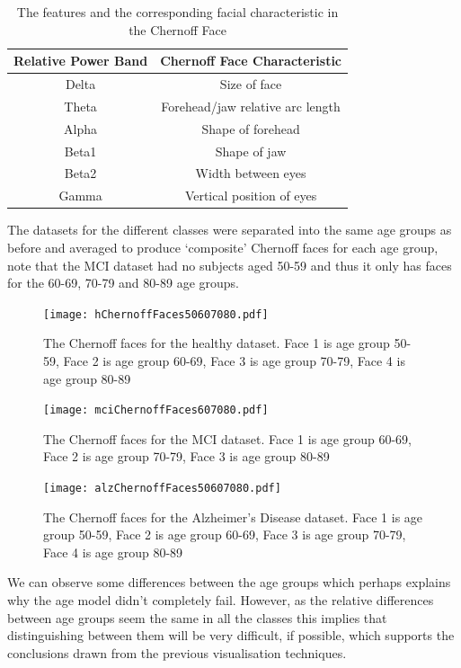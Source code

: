 \begin{table}[h!]
\begin{center}
\begin{tabular}[h!]{|c|c|}
\hline
Relative Power Band & Chernoff Face Characteristic \\
\hline
Delta & Size of face \\
\hline
Theta & Forehead/jaw relative arc length \\
\hline
Alpha & Shape of forehead\\
\hline
Beta1 & Shape of jaw\\
\hline
Beta2 & Width between eyes\\
\hline
Gamma & Vertical position of eyes\\
\hline
\end{tabular}
\caption{The features and the corresponding facial characteristic in the Chernoff Face}
\label{tab:chernoff}
\end{center}
\end{table}

The datasets for the different classes were separated into the same age groups as before and averaged to produce `composite' Chernoff faces for each age group, note that the MCI dataset had no subjects aged 50-59 and thus it only has faces for the 60-69, 70-79 and 80-89 age groups.


\begin{figure}[h!]
  \centering
    \texttt{[image: hChernoffFaces50607080.pdf]}
    \caption{The Chernoff faces for the healthy dataset. Face 1 is age group 50-59, Face 2 is age group 60-69, Face 3 is age group 70-79, Face 4 is age group 80-89}
    \label{fig:hchernoff}
\end{figure}

\begin{figure}[h!]
  \centering
    \texttt{[image: mciChernoffFaces607080.pdf]}
    \caption{The Chernoff faces for the MCI dataset. Face 1 is age group 60-69, Face 2 is age group 70-79, Face 3 is age group 80-89}
    \label{fig:mcichernoff}
\end{figure}

\begin{figure}[h!]
  \centering
    \texttt{[image: alzChernoffFaces50607080.pdf]}
    \caption{The Chernoff faces for the Alzheimer's Disease dataset. Face 1 is age group 50-59, Face 2 is age group 60-69, Face 3 is age group 70-79, Face 4 is age group 80-89}
    \label{fig:alzchernoff}
\end{figure}

We can observe some differences between the age groups which perhaps explains why the age model didn't completely fail. However, as the relative differences between age groups seem the same in all the classes this implies that distinguishing between them will be very difficult, if possible, which supports the conclusions drawn from the previous visualisation techniques.






